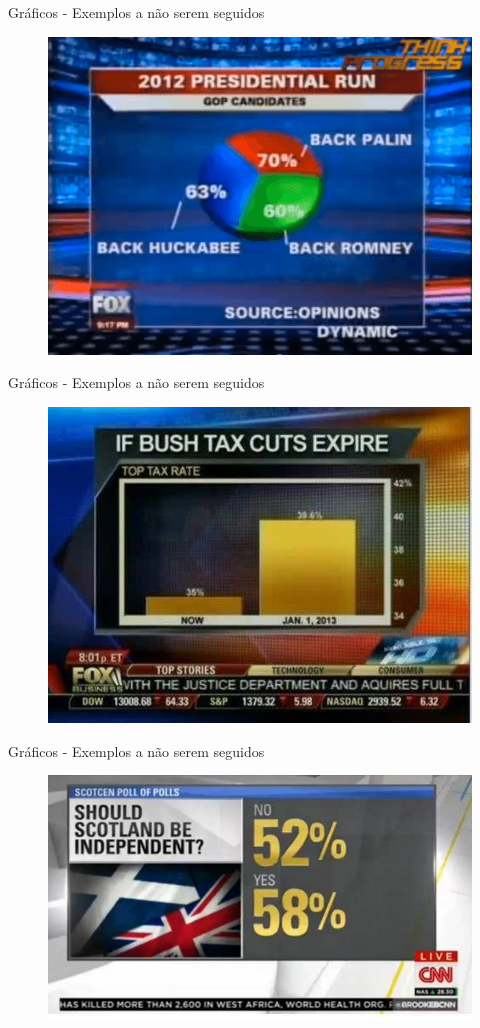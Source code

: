 \begin{frame}{Gráficos - Exemplos a não serem seguidos}
    \begin{figure}
        \centering
        \includegraphics[width=0.8\linewidth]{figures/lie_1.png}
    \end{figure}
\end{frame}

\begin{frame}{Gráficos - Exemplos a não serem seguidos}
    \begin{figure}
        \centering
        \includegraphics[width=0.8\linewidth]{figures/lie_2.jpeg}
    \end{figure}
\end{frame}


\begin{frame}{Gráficos - Exemplos a não serem seguidos}
    \begin{figure}
        \centering
        \includegraphics[width=0.8\linewidth]{figures/lie_4.jpg}
    \end{figure}
\end{frame}

